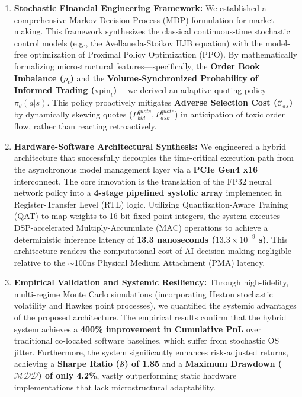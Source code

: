 \begin{enumerate}
    \item \textbf{Stochastic Financial Engineering Framework:} 
    We established a comprehensive Markov Decision Process (MDP) formulation for market making. This framework synthesizes the classical continuous-time stochastic control models (e.g., the Avellaneda-Stoikov HJB equation) with the model-free optimization of Proximal Policy Optimization (PPO). By mathematically formalizing microstructural features—specifically, the \textbf{Order Book Imbalance ($\rho_t$)} and the \textbf{Volume-Synchronized Probability of Informed Trading ($\text{vpin}_t$)} \citep{Easley2012}—we derived an adaptive quoting policy $\pi_\theta(a|s)$. This policy proactively mitigates \textbf{Adverse Selection Cost ($\mathcal{C}_{as}$)} by dynamically skewing quotes ($P_{bid}^{quote}, P_{ask}^{quote}$) in anticipation of toxic order flow, rather than reacting retroactively.

    \item \textbf{Hardware-Software Architectural Synthesis:} 
    We engineered a hybrid architecture that successfully decouples the time-critical execution path from the asynchronous model management layer via a \textbf{PCIe Gen4 x16} interconnect. The core innovation is the translation of the FP32 neural network policy into a \textbf{4-stage pipelined systolic array} implemented in Register-Transfer Level (RTL) logic. Utilizing Quantization-Aware Training (QAT) to map weights to 16-bit fixed-point integers, the system executes DSP-accelerated Multiply-Accumulate (MAC) operations to achieve a deterministic inference latency of \textbf{13.3 nanoseconds ($13.3 \times 10^{-9}$ s)}. This architecture renders the computational cost of AI decision-making negligible relative to the $\sim$100ns Physical Medium Attachment (PMA) latency.

    \item \textbf{Empirical Validation and Systemic Resiliency:} 
    Through high-fidelity, multi-regime Monte Carlo simulations (incorporating Heston stochastic volatility and Hawkes point processes), we quantified the systemic advantages of the proposed architecture. The empirical results confirm that the hybrid system achieves a \textbf{400\% improvement in Cumulative PnL} over traditional co-located software baselines, which suffer from stochastic OS jitter. Furthermore, the system significantly enhances risk-adjusted returns, achieving a \textbf{Sharpe Ratio ($\mathcal{S}$) of 1.85} and a \textbf{Maximum Drawdown ($\mathcal{MDD}$) of only 4.2\%}, vastly outperforming static hardware implementations that lack microstructural adaptability.
\end{enumerate}

